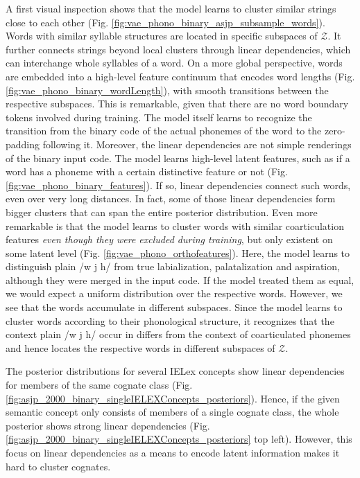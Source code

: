 \documentclass[6pt]{article}
\begin{document}
{A first visual inspection shows that the model learns to cluster similar strings close to each other (Fig. \ref{fig:vae_phono_binary_asjp_subsample_words}). Words with similar syllable structures are located in specific subspaces of $\mathcal{Z}$. It further connects strings beyond local clusters through linear dependencies, which can interchange whole syllables of a word. 
On a more global perspective, words are embedded into a high-level feature continuum that encodes word lengths (Fig. \ref{fig:vae_phono_binary_wordLength}), with smooth transitions between the respective subspaces. This is remarkable, given that there are no word boundary tokens involved during training. The model itself learns to recognize the transition from the binary code of the actual phonemes of the word to the zero-padding following it.
Moreover, the linear dependencies are not simple renderings of the binary input code. The model learns high-level latent features, such as if a word has a phoneme with a certain distinctive feature or not (Fig. \ref{fig:vae_phono_binary_features}). If so, linear dependencies connect such words, even over very long distances. In fact, some of those linear dependencies form bigger clusters that can span the entire posterior distribution. 
Even more remarkable is that the model learns to cluster words with similar coarticulation features \textit{even though they were excluded during training}, but only existent on some latent level (Fig. \ref{fig:vae_phono_orthofeatures}). Here, the model learns to distinguish plain /w j h/ from true labialization, palatalization and aspiration, although they were merged in the input code. If the model treated them as equal, we would expect a uniform distribution over the respective words. However, we see that the words accumulate in different subspaces. Since the model learns to cluster words according to their phonological structure, it recognizes that the context plain /w j h/ occur in differs from the context of coarticulated phonemes and hence locates the respective words in different subspaces of $\mathcal{Z}$.

The posterior distributions for several IELex concepts show linear dependencies for members of the same cognate class (Fig. \ref{fig:asjp_2000_binary_singleIELEXConcepts_posteriors}). Hence, if the given semantic concept only consists of members of a single cognate class, the whole posterior shows strong linear dependencies (Fig. \ref{fig:asjp_2000_binary_singleIELEXConcepts_posteriors} top left). However, this focus on linear dependencies as a means to encode latent information makes it hard to cluster cognates. 

}
\end{document}
